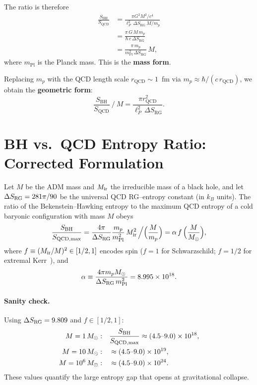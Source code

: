\documentclass[aps,prd,onecolumn,nofootinbib,superscriptaddress]{revtex4-2}
\begin{document}
The ratio is therefore
\begin{align}
\frac{S_{\mathrm{BH}}}{S_{\mathrm{QCD}}}
&= \frac{\pi G^2 M^2 / c^4}{\ell_P^2 \, \Delta S_{\mathrm{RG}} \, M / m_p} \\
&= \frac{\pi \, G \, M \, m_p}{\hbar \, c \, \Delta S_{\mathrm{RG}}} \\
&= \frac{\pi \, m_p}{m_{\mathrm{Pl}}^2 \, \Delta S_{\mathrm{RG}}} \, M,
\end{align}
where $m_{\mathrm{Pl}}$ is the Planck mass. This is the \textbf{mass form}.

Replacing $m_p$ with the QCD length scale $r_{\mathrm{QCD}} \sim 1$~fm via
$m_p \approx \hbar / (c\,r_{\mathrm{QCD}})$, we obtain the \textbf{geometric form}:
\begin{equation}
\frac{S_{\mathrm{BH}}}{S_{\mathrm{QCD}}} \ \bigg/ \ M
= \frac{\pi r_{\mathrm{QCD}}^2}{\ell_P^2 \, \Delta S_{\mathrm{RG}}}.
\end{equation}



\section{BH vs.\ QCD Entropy Ratio: Corrected Formulation}

\begin{theorem}
Let $M$ be the ADM mass and $M_{\rm ir}$ the irreducible mass of a black hole,
and let $\Delta S_{\rm RG}=281\pi/90$ be the universal QCD RG--entropy constant (in $k_B$ units).
The ratio of the Bekenstein--Hawking entropy to the maximum QCD entropy
of a cold baryonic configuration with mass $M$ obeys
\begin{equation}
\frac{S_{\rm BH}}{S_{\rm QCD,max}}
= \frac{4\pi}{\Delta S_{\rm RG}}\frac{m_p}{m_{\rm Pl}^2}\,M_{\rm ir}^2\,\Big/\Big(\frac{M}{m_p}\Big)
= \alpha\,f\,\Big(\frac{M}{M_\odot}\Big),
\end{equation}
where $f\equiv(M_{\rm ir}/M)^2\in[1/2,1]$ encodes spin
($f{=}1$ for Schwarzschild; $f{=}1/2$ for extremal Kerr~\cite{christodoulou1970,christodoulouRuffini1971,bardeen1973}),
and
\begin{equation}
\alpha \equiv \frac{4\pi m_p M_\odot}{\Delta S_{\rm RG}\,m_{\rm Pl}^2}
= 8.995\times10^{18}.
\end{equation}
\end{theorem}

\paragraph{Sanity check.}
Using $\Delta S_{\rm RG}=9.809$ and $f\in[1/2,1]$:
\begin{align}
M=1\,M_\odot:&\quad \frac{S_{\rm BH}}{S_{\rm QCD,max}}\approx (4.5\text{--}9.0)\times10^{18},\\
M=10\,M_\odot:&\quad \approx (4.5\text{--}9.0)\times10^{19},\\
M=10^6\,M_\odot:&\quad \approx (4.5\text{--}9.0)\times10^{24}.
\end{align}
These values quantify the large entropy gap that opens at gravitational collapse.
\end{document}
